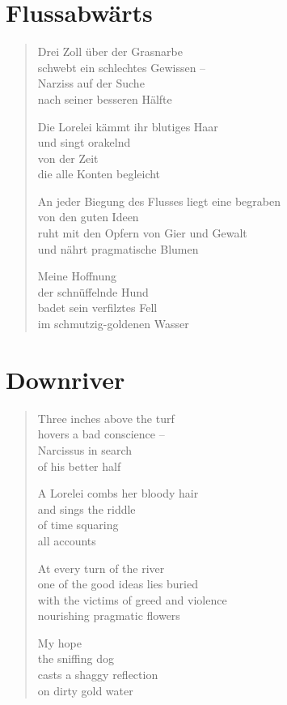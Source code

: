 
\cleartoverso

\section{Flussabwärts}

\begin{verse}

Drei Zoll über der Grasnarbe\\
schwebt ein schlechtes Gewissen --\\
Narziss auf der Suche\\
nach seiner besseren Hälfte

Die Lorelei kämmt ihr blutiges Haar\\
und singt orakelnd\\
von der Zeit\\
die alle Konten begleicht

An jeder Biegung des Flusses liegt eine begraben\\
von den guten Ideen\\
ruht mit den Opfern von Gier und Gewalt\\
und nährt pragmatische Blumen

Meine Hoffnung\\
der schnüffelnde Hund\\
badet sein verfilztes Fell\\
im schmutzig-goldenen Wasser

\end{verse}

\clearpage

\section{Downriver}

\begin{verse}

Three inches above the turf\\
hovers a bad conscience --\\
Narcissus in search\\
of his better half

A Lorelei combs her bloody hair\\
and sings the riddle\\
of time squaring\\
all accounts

At every turn of the river\\
one of the good ideas lies buried\\
with the victims of greed and violence\\
nourishing pragmatic flowers

My hope\\
the sniffing dog\\
casts a shaggy reflection\\
on dirty gold water

\end{verse}
